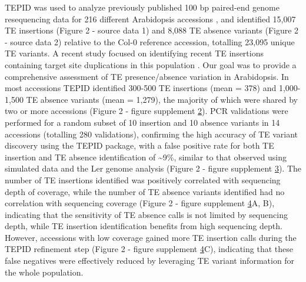 \documentclass[12pt]{article}
\begin{document}
TEPID was used to analyze previously published 100 bp paired-end
genome resequencing data for 216 different Arabidopsis accessions
\cite{Schmitz:2013iu}, and identified 15,007 TE insertions (Figure 2 -
source data 1) and 8,088 TE absence variants (Figure 2 - source data
2) relative to the Col-0 reference accession, totalling 23,095 unique
TE variants.  A recent study focused on identifying recent TE
insertions containing target site duplications in this population
\cite{Quadrana:2016bi}.  Our goal was to provide a comprehensive
assessment of TE presence/absence variation in Arabidopsis.  In most
accessions TEPID identified 300-500 TE insertions (mean = 378) and
1,000-1,500 TE absence variants (mean = 1,279), the majority of which
were shared by two or more accessions (Figure 2 - figure supplement
\hyperref[fig2s2]{2}).  PCR validations were performed for a random
subset of 10 insertion and 10 absence variants in 14 accessions
(totalling 280 validations), confirming the high accuracy of TE
variant discovery using the TEPID package, with a false positive rate
for both TE insertion and TE absence identification of
\textasciitilde{}9\%, similar to that observed using simulated data
and the Ler genome analysis (Figure 2 - figure supplement
\hyperref[fig2s3]{3}).  The number of TE insertions identified was
positively correlated with sequencing depth of coverage, while the
number of TE absence variants identified had no correlation with
sequencing coverage (Figure 2 - figure supplement
\hyperref[fig2s4]{4}A, B), indicating that the sensitivity of TE
absence calls is not limited by sequencing depth, while TE insertion
identification benefits from high sequencing depth. However,
accessions with low coverage gained more TE insertion calls during the
TEPID refinement step (Figure 2 - figure supplement
\hyperref[fig2s4]{4}C), indicating that these false negatives were
effectively reduced by leveraging TE variant information for the whole
population.
\end{document}
